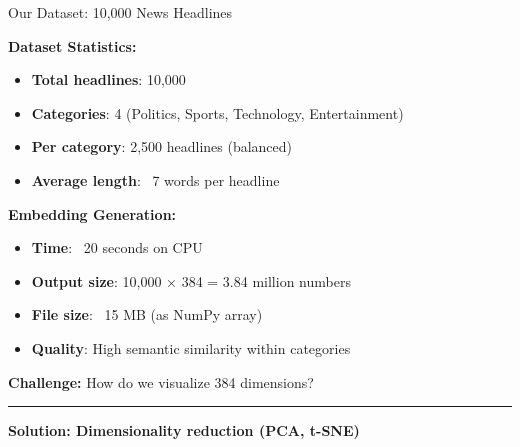 \documentclass[8pt,aspectratio=169]{beamer}
\newcommand{\bottomnote}[1]{%
\vfill
\vspace{-2mm}
\textcolor{mllavender2}{\rule{\textwidth}{0.4pt}}
\vspace{1mm}
\footnotesize
\textbf{#1}
}
\begin{document}
\begin{frame}[t]{Our Dataset: 10,000 News Headlines}

\textbf{Dataset Statistics:}

\begin{itemize}
    \item \textbf{Total headlines}: 10,000
    \item \textbf{Categories}: 4 (Politics, Sports, Technology, Entertainment)
    \item \textbf{Per category}: 2,500 headlines (balanced)
    \item \textbf{Average length}: ~7 words per headline
\end{itemize}

\vspace{0.5cm}

\textbf{Embedding Generation:}

\begin{itemize}
    \item \textbf{Time}: ~20 seconds on CPU
    \item \textbf{Output size}: 10,000 × 384 = 3.84 million numbers
    \item \textbf{File size}: ~15 MB (as NumPy array)
    \item \textbf{Quality}: High semantic similarity within categories
\end{itemize}

\vspace{0.5cm}

\textbf{Challenge:} How do we visualize 384 dimensions?

\bottomnote{Solution: Dimensionality reduction (PCA, t-SNE)}
\end{frame}
\end{document}
